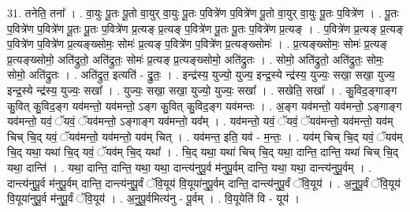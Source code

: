 \documentclass[17pt]{extarticle}
\begin{document}
31. तनेति॒ तना᳚ । . वा॒युः पू॒तः पू॒तो वा॒युर् वा॒युः पू॒तः प॒वित्रे॑ण प॒वित्रे॑ण पू॒तो वा॒युर् वा॒युः पू॒तः प॒वित्रे॑ण । . पू॒तः प॒वित्रे॑ण प॒वित्रे॑ण पू॒तः पू॒तः प॒वित्रे॑ण प्र॒त्यङ् प्र॒त्यङ् प॒वित्रे॑ण पू॒तः पू॒तः प॒वित्रे॑ण प्र॒त्यङ् । . प॒वित्रे॑ण प्र॒त्यङ् प्र॒त्यङ् प॒वित्रे॑ण प॒वित्रे॑ण प्र॒त्यङ्ख्सोमः॒ सोमः॑ प्र॒त्यङ् प॒वित्रे॑ण प॒वित्रे॑ण 
प्र॒त्यङ्ख्सोमः॑ । . प्र॒त्यङ्ख्सोमः॒ सोमः॑ प्र॒त्यङ् प्र॒त्यङ्ख्सोमो॒ अति॑द्रुतो॒ अति॑द्रुतः॒ सोमः॑ प्र॒त्यङ् प्र॒त्यङ्ख्सोमो॒ अति॑द्रुतः । . सोमो॒ अति॑द्रुतो॒ अति॑द्रुतः॒ सोमः॒ सोमो॒ अति॑द्रुतः । . अति॑द्रुत॒ इत्यति॑ - द्रु॒तः॒ । . इन्द्र॑स्य॒ युज्यो॒ युज्य॒ इन्द्र॒स्ये न्द्र॑स्य॒ युज्यः॒ सखा॒ सखा॒ युज्य॒ इन्द्र॒स्ये न्द्र॑स्य॒ युज्यः॒ सखा᳚ । . युज्यः॒ सखा॒ सखा॒ युज्यो॒ युज्यः॒ सखा᳚ । . सखेति॒ सखा᳚ । . कु॒विद॒ङ्गाङ्ग कु॒वित् कु॒विद॒ङ्ग यव॑मन्तो॒ यव॑मन्तो॒ ऽङ्ग कु॒वित् कु॒विद॒ङ्ग यव॑मन्तः । . अ॒ङ्ग यव॑मन्तो॒ यव॑मन्तो॒ ऽङ्गाङ्ग यव॑मन्तो॒ यवं॒ ॅयवं॒ ॅयव॑मन्तो॒ ऽङ्गाङ्ग यव॑मन्तो॒ यव᳚म् । . यव॑मन्तो॒ यवं॒ ॅयवं॒ ॅयव॑मन्तो॒ यव॑मन्तो॒ यव॑म् चिच् चि॒द् यवं॒ ॅयव॑मन्तो॒ यव॑मन्तो॒ यव॑म् चित् । . यव॑मन्त॒ इति॒ यव॑ - म॒न्तः॒ । . यव॑म् चिच् चि॒द् यवं॒ ॅयव॑म् चि॒द् यथा॒ यथा॑ चि॒द् यवं॒ ॅयव॑म् चि॒द् यथा᳚ । . चि॒द् यथा॒ यथा॑ चिच् चि॒द् यथा॒ दान्ति॒ दान्ति॒ यथा॑ चिच् चि॒द् यथा॒ दान्ति॑ । . यथा॒ दान्ति॒ दान्ति॒ यथा॒ यथा॒ दान्त्य॑नुपू॒र्व म॑नुपू॒र्वम् दान्ति॒ यथा॒ यथा॒ दान्त्य॑नुपू॒र्वम् । . दान्त्य॑नुपू॒र्व म॑नुपू॒र्वम् दान्ति॒ दान्त्य॑नुपू॒र्वं ॅवि॒यूय॑ वि॒यूया॑नुपू॒र्वम् दान्ति॒ दान्त्य॑नुपू॒र्वं ॅवि॒यूय॑ । . अ॒नु॒पू॒र्वं ॅवि॒यूय॑ वि॒यूया॑नुपू॒र्व म॑नुपू॒र्वं ॅवि॒यूय॑ । . अ॒नु॒पू॒र्वमित्य॑नु - पू॒र्वम् । . वि॒यूयेति॑ वि - यूय॑ । \newline
\end{document}
